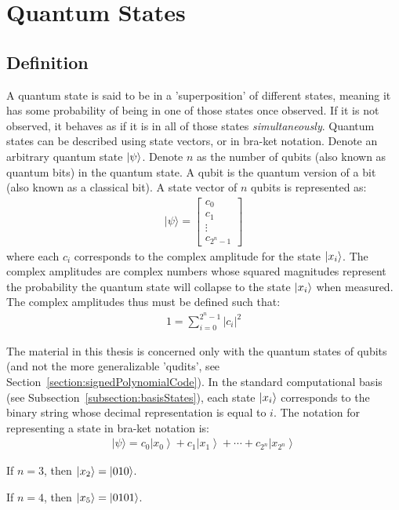 \section{Quantum States}
\subsection{Definition}
A quantum state is said to be in a 'superposition' of different states, meaning it has some probability of being in one of those states once observed. If it is not observed, it behaves as if it is in all of those states \emph{simultaneously}. Quantum states can be described using state vectors, or in bra-ket notation.
Denote an arbitrary quantum state $\ket{\psi}$. Denote $n$ as the number of qubits (also known as quantum bits) in the quantum state. A qubit is the quantum version of a bit (also known as a classical bit). A state vector of $n$ qubits is represented as:
\begin{align}
|\psi\rangle=\left[\begin{array}{c}
c_{0} \\
c_{1} \\
\vdots \\
c_{2^n - 1}
\end{array}\right]
\end{align}
where each $c_i$ corresponds to the complex amplitude for the state $\ket{x_i}$. The complex amplitudes are complex numbers whose squared magnitudes represent the probability the quantum state will collapse to the state $\ket{x_i}$ when measured. The complex amplitudes thus must be defined such that:
\begin{align}
\label{eq:quantumStateConstraint}
1 = \sum_{i=0}^{2^n - 1} \lvert c_i \rvert ^2
\end{align}

The material in this thesis is concerned only with the quantum states of qubits (and not the more generalizable 'qudits', see Section~\ref{section:signedPolynomialCode}). In the standard computational basis (see Subsection~\ref{subsection:basisStates}), each state $\ket{x_i}$ corresponds to the binary string whose decimal representation is equal to $i$. The notation for representing a state in bra-ket notation is:
\begin{align}
\label{eq:braketArbitraryStandardBasisState}
|\psi\rangle=c_{0}\left|x_{0}\right\rangle+c_{1}\left|x_{1}\right\rangle+\cdots+c_{2^n}\left|x_{2^n}\right\rangle
\end{align}
\begin{example}
If $n=3$, then $\ket{x_2} = \ket{010}$.
\end{example}
\begin{example}
If $n=4$, then $\ket{x_5} = \ket{0101}$.
\end{example}

